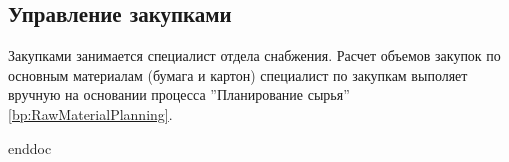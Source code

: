 \newpage
\subsection{Управление закупками}

Закупками занимается специалист отдела снабжения.
Расчет объемов закупок по основным материалам (бумага и картон) специалист по закупкам выполяет вручную на основании процесса ''Планирование сырья'' \ref{bp:RawMaterialPlanning}.

%
\clearpage
 {enddoc}